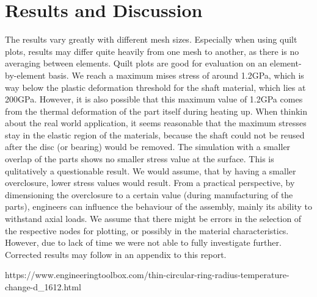 \documentclass[12pt]{article}
\begin{document}
\pagebreak
\section{Results and Discussion}

The results vary greatly with different mesh sizes. Especially when using quilt plots,
results may differ quite heavily from one mesh to another, as there is no averaging between elements.
Quilt plots are good for evaluation on an element-by-element basis.
We reach a maximum mises stress of around 1.2GPa, which is way below the plastic deformation threshold
for the shaft material, which lies at 200GPa. 
However, it is also possible that this maximum value of 1.2GPa comes from the thermal 
deformation of the part itself during heating up.
When thinkin about the real world application, it seems
reasonable that the maximum stresses stay in the elastic
region of the materials, because the shaft could not be reused after the disc (or bearing) would be removed.
The simulation with a smaller overlap of the parts shows no smaller stress value at the surface.
This is qulitatively a questionable result. We would assume, that by having a smaller
overclosure, lower stress values would result.
From a practical perspective, by dimensioning the overclosure to a certain
value (during manufacturing of the parts), engineers can influence the behaviour of the 
assembly, mainly its ability to withstand axial loads. 
We assume that there might be errors in the selection of the respective nodes for plotting,
or possibly in the material characteristics. However, due to lack of time we were not able to 
fully investigate further. Corrected results may follow in an appendix to this report.

\pagebreak
\begin{thebibliography}{9}
  https://www.engineeringtoolbox.com/thin-circular-ring-radius-temperature-change-d\_1612.html
\end{thebibliography}
\end{document}
